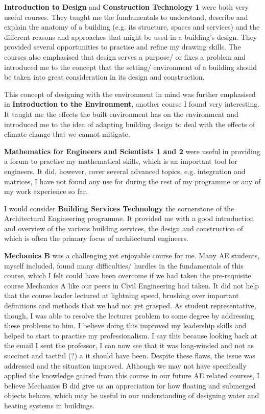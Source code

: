 \textbf{Introduction to Design} and \textbf{Construction Technology 1} were both very useful courses.
They taught me the fundamentals to understand, describe and explain the anatomy of a building (e.g. its structure, spaces and services) and the different reasons and approaches that might be used in a building's design.
They provided several opportunities to practise and refine my drawing skills.
The courses also emphasised that design serves a purpose/ or fixes a problem and introduced me to the concept that the setting/ environment of a building should be taken into great consideration in its design and construction.

This concept of designing with the environment in mind was further emphasised in \textbf{Introduction to the Environment}, another course I found very interesting.
It taught me the effects the built environment has on the environment and introduced me to the idea of adapting building design to deal with the effects of climate change that we cannot mitigate.

\textbf{Mathematics for Engineers and Scientists 1 and 2} were useful in providing a forum to practise my mathematical skills, which is an important tool for engineers.
It did, however, cover several advanced topics, e.g. integration and matrices, I have not found any use for during the rest of my programme or any of my work experience so far.

I would consider \textbf{Building Services Technology} the cornerstone of the Architectural Engineering programme.
It provided me with a good introduction and overview of the various building services, the design and construction of which is often the primary focus of architectural engineers.

\textbf{Mechanics B} was a challenging yet enjoyable course for me.
Many AE students, myself included, found many difficulties/ hurdles in the fundamentals of this course, which I felt could have been overcome if we had taken the pre-requisite course Mechanics A like our peers in Civil Engineering had taken.
It did not help that the course leader lectured at lightning speed, brushing over important definitions and methods that we had not yet grasped.
As student representative, though, I was able to resolve the lecturer problem to some degree by addressing these problems to him.
I believe doing this improved my leadership skills and helped to start to practise my professionalism.
I say this because looking back at the email I sent the professor, I can now see that it was long-winded and not as succinct and tactful (?) a it should have been.
Despite these flaws, the issue was addressed and the situation improved.
Although we may not have specifically applied the knowledge gained from this course in our future AE related courses, I believe Mechanics B did give us an appreciation for how floating and submerged objects behave, which may be useful in our understanding of designing water and heating systems in buildings.

